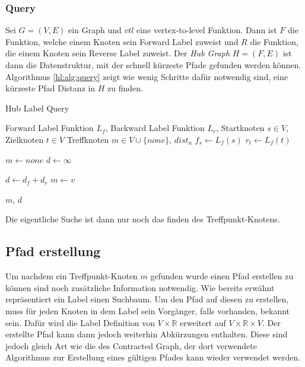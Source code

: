 \subsubsection{Query}

Sei $G = (V, E)$ ein Graph und ${vtl}$ eine vertex-to-level Funktion.
Dann ist $F$ die Funktion, welche einem Knoten sein Forward Label zuweist und $R$ die Funktion, die einem Knoten sein Reverse Label zuweist.
Der \emph{Hub Graph} $H = (F, E)$ ist dann die Datenstruktur, mit der schnell kürzeste Pfade gefunden werden können.
Algorithmus \ref{hl:alg:query} zeigt wie wenig Schritte dafür notwendig sind, eine kürzeste Pfad Distanz in $H$ zu finden.

\begin{algorithm}[ht]
    \caption{Hub Label Query}
    \begin{algorithmic}[1]
        \Require Forward Label Funktion $L_f$, Backward Label Funktion $L_r$, Startknoten $s \in V$, Zielknoten $t \in V$
        \Ensure Treffknoten $m \in V \cup \{ {none} \}$, ${dist}_u$
        \State $f_s \leftarrow L_f (s)$
        \State $r_t \leftarrow L_f (t)$

        \State
        \State $m \leftarrow {none}$
        \State $d \leftarrow \infty$

        \State $d \leftarrow d_f + d_r$
        \State $m \leftarrow v$
        \EndIf
        \EndFor

        \State
        \State \Return $m$, $d$
    \end{algorithmic}
    \label{hl:alg:query}
\end{algorithm}

Die eigentliche Suche ist dann nur noch das finden des Treffpunkt-Knotens.


\subsection{Pfad erstellung}

Um nachdem ein Treffpunkt-Knoten $m$ gefunden wurde einen Pfad erstellen zu können sind noch zusätzliche Information notwendig.
Wie bereits erwähnt repräsentiert ein Label einen Suchbaum.
Um den Pfad auf diesen zu erstellen, muss für jeden Knoten in dem Label sein Vorgänger, falls vorhanden, bekannt sein.
Dafür wird die Label Definition von $V \times \mathbb{R}$ erweitert auf $V \times \mathbb{R} \times V$.
Der erstellte Pfad kann dann jedoch weiterhin Abkürzungen enthalten.
Diese sind jedoch gleich Art wie die des Contracted Graph, der dort verwendete Algorithmus zur Erstellung eines gültigen Pfades kann wieder verwendet werden.


